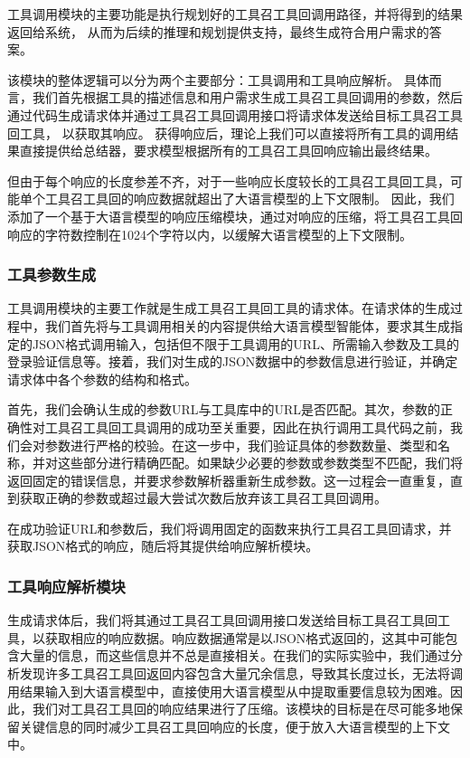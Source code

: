 工具调用模块的主要功能是执行规划好的工具召工具回调用路径，并将得到的结果返回给系统，
从而为后续的推理和规划提供支持，最终生成符合用户需求的答案。

该模块的整体逻辑可以分为两个主要部分：工具调用和工具响应解析。
具体而言，我们首先根据工具的描述信息和用户需求生成工具召工具回调用的参数，然后通过代码生成请求体并通过工具召工具回调用接口将请求体发送给目标工具召工具回工具，
以获取其响应。
获得响应后，理论上我们可以直接将所有工具的调用结果直接提供给总结器，要求模型根据所有的工具召工具回响应输出最终结果。

但由于每个响应的长度参差不齐，对于一些响应长度较长的工具召工具回工具，可能单个工具召工具回的响应数据就超出了大语言模型的上下文限制。
因此，我们添加了一个基于大语言模型的响应压缩模块，通过对响应的压缩，将工具召工具回响应的字符数控制在1024个字符以内，以缓解大语言模型的上下文限制。

\subsubsection{工具参数生成}

工具调用模块的主要工作就是生成工具召工具回工具的请求体。在请求体的生成过程中，我们首先将与工具调用相关的内容提供给大语言模型智能体，要求其生成指定的JSON格式调用输入，包括但不限于工具调用的URL、所需输入参数及工具的登录验证信息等。接着，我们对生成的JSON数据中的参数信息进行验证，并确定请求体中各个参数的结构和格式。

首先，我们会确认生成的参数URL与工具库中的URL是否匹配。其次，参数的正确性对工具召工具回工具调用的成功至关重要，因此在执行调用工具代码之前，我们会对参数进行严格的校验。在这一步中，我们验证具体的参数数量、类型和名称，并对这些部分进行精确匹配。如果缺少必要的参数或参数类型不匹配，我们将返回固定的错误信息，并要求参数解析器重新生成参数。这一过程会一直重复，直到获取正确的参数或超过最大尝试次数后放弃该工具召工具回调用。

在成功验证URL和参数后，我们将调用固定的函数来执行工具召工具回请求，并获取JSON格式的响应，随后将其提供给响应解析模块。

\subsubsection{工具响应解析模块}

生成请求体后，我们将其通过工具召工具回调用接口发送给目标工具召工具回工具，以获取相应的响应数据。响应数据通常是以JSON格式返回的，这其中可能包含大量的信息，而这些信息并不总是直接相关。在我们的实际实验中，我们通过分析发现许多工具召工具回返回内容包含大量冗余信息，导致其长度过长，无法将调用结果输入到大语言模型中，直接使用大语言模型从中提取重要信息较为困难。因此，我们对工具召工具回的响应结果进行了压缩。该模块的目标是在尽可能多地保留关键信息的同时减少工具召工具回响应的长度，便于放入大语言模型的上下文中。

